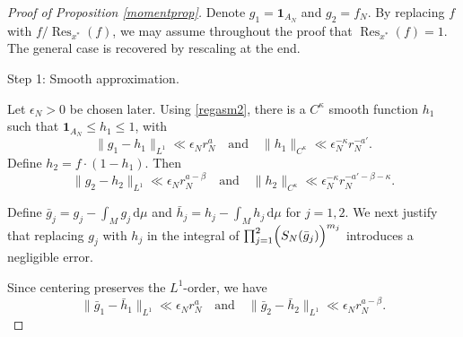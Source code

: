 \documentclass[11pt,twoside,a4paper,reqno]{amsart}
\newcommand{\Res}{\operatorname{Res}}
\renewcommand{\d}{\, \text{d}}
\def\one{{\mathbf{1}}}
\begin{document}
\begin{proof}[Proof of Proposition \ref{momentprop}]
Denote $g_1=\one_{A_N}$ and $g_2=f_N$. By replacing $f$ with $f/\Res_{x^*}(f)$, we may assume throughout the proof that $\Res_{x^*}(f)=1$. The general case is recovered by rescaling at the end.






Step 1: Smooth approximation.

Let $\epsilon_N>0$ be chosen later. Using \eqref{regasm2}, there is a $C^{\kappa}$ smooth function $h_1$ such that $\one_{A_N}\le h_1\le 1$, with
\begin{equation*}
\|g_1- h_1\|_{L^1} \ll \epsilon_N r_N^a \quad \text{and} \quad \|h_1\|_{C^{\kappa}} \ll \epsilon_N^{-\kappa} r_N^{-a'}.
\end{equation*}
Define $h_2= f \cdot (1-h_1)$. Then
\begin{equation*}
\|g_2 - h_2 \|_{L^1} \ll \epsilon_N r_N^{a-\beta} \quad \text{and} \quad \|h_2\|_{C^{\kappa}} \ll \epsilon_N^{-\kappa} r_N^{-a'-\beta-\kappa}.
\end{equation*}


Define $\bar{g}_j=g_j-\int_M g_j \d\mu$ and $\bar{h}_j=h_j - \int_M h_j \d\mu$ for $j=1, 2.$ We next justify that replacing $g_j$ with $h_j$ in the integral of $\prod_{j=1}^2 \Bigl(S_N(\bar{g}_j)\Bigr)^{m_j}$ introduces a negligible error.

Since centering preserves the $L^1$-order, we have
\begin{equation}\label{cL1e}
\|\bar g_1-\bar h_1\|_{L^1}\ll \epsilon_N r_N^a
\quad \text{and} \quad
\|\bar g_2-\bar h_2\|_{L^1}\ll \epsilon_N r_N^{a-\beta}.
\end{equation}



\end{proof}
\end{document}
